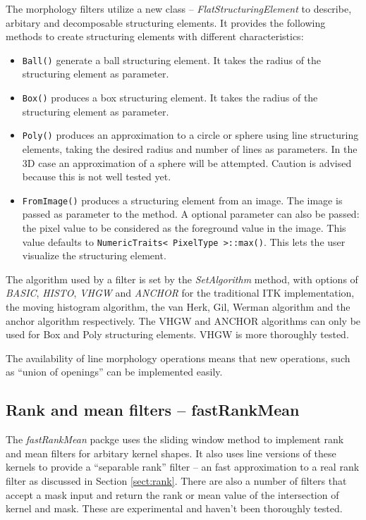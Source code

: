 \documentclass{InsightArticle}
\begin{document}
The morphology filters utilize a new class -- {\em
FlatStructuringElement} to describe, arbitary and decomposable
structuring elements. It provides the following methods to create
structuring elements with different characteristics:
\begin{itemize}
  \item \verb$Ball()$ generate a ball structuring element. It takes the 
	radius of the structuring element as parameter.
  \item \verb$Box()$ produces a box structuring element. It takes the radius 
	of the structuring element as parameter.
  \item \verb$Poly()$ produces an approximation to a circle or sphere using 
	line structuring elements, taking the desired radius and number of 
	lines as parameters. In the 3D case an approximation of a sphere will 
	be attempted. Caution is advised because this is not well tested yet.
  \item \verb$FromImage()$ produces a structuring element from an image. The image is passed
as parameter to the method. A optional parameter can also be passed: the pixel value
to be considered as the foreground value in the image. This value defaults to
\verb$NumericTraits< PixelType >::max()$. This lets the user visualize the structuring element.
\end{itemize}

The algorithm used by a filter is set by the {\em SetAlgorithm}
method, with options of {\em BASIC}, {\em HISTO}, {\em VHGW} and {\em
ANCHOR} for the traditional ITK implementation, the moving histogram
algorithm, the van Herk, Gil, Werman algorithm and the anchor
algorithm respectively. The VHGW and ANCHOR algorithms can only be
used for Box and Poly structuring elements. VHGW is more thoroughly
tested.

The availability of line morphology operations means that new
operations, such as ``union of openings'' can be implemented easily.

\subsection{Rank and mean filters -- fastRankMean}
The {\em fastRankMean} packge uses the sliding window method to
implement rank and mean filters for arbitary kernel shapes. It also
uses line versions of these kernels to provide a ``separable rank''
filter -- an fast approximation to a real rank filter as discussed in
Section \ref{sect:rank}. There are also a number of filters that
accept a mask input and return the rank or mean value of the
intersection of kernel and mask. These are experimental and haven't
been thoroughly tested.
\end{document}
